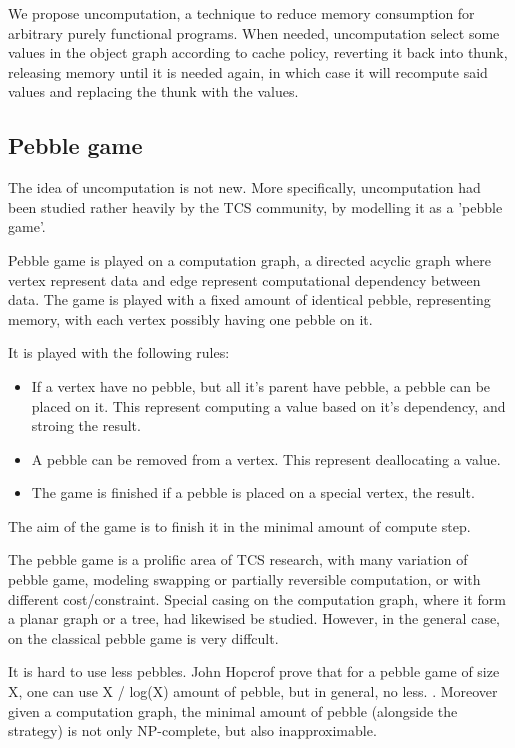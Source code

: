 We propose uncomputation, a technique to reduce memory consumption for arbitrary purely functional programs. When needed, uncomputation select some values in the object graph according to cache policy, reverting it back into thunk, releasing memory until it is needed again, in which case it will recompute said values and replacing the thunk with the values.

\subsection{Pebble game}
The idea of uncomputation is not new. More specifically, uncomputation had been studied rather heavily by the TCS community, by modelling it as a 'pebble game'. 

Pebble game is played on a computation graph, a directed acyclic graph where vertex represent data and edge represent computational dependency between data. The game is played with a fixed amount of identical pebble, representing memory, with each vertex possibly having one pebble on it. 

It is played with the following rules:
\begin{itemize}
\item If a vertex have no pebble, but all it's parent have pebble, a pebble can be placed on it. This represent computing a value based on it's dependency, and stroing the result.
\item A pebble can be removed from a vertex. This represent deallocating a value.
\item The game is finished if a pebble is placed on a special vertex, the result.
\end{itemize}

The aim of the game is to finish it in the minimal amount of compute step.

The pebble game is a prolific area of TCS research, with many variation of pebble game, modeling swapping or partially reversible computation, or with different cost/constraint. Special casing on the computation graph, where it form a planar graph or a tree, had likewised be studied. However, in the general case, on the classical pebble game is very diffcult.

It is hard to use less pebbles. John Hopcrof prove that for a pebble game of size X, one can use X / log(X) amount of pebble, but in general, no less. . Moreover given a computation graph, the minimal amount of pebble (alongside the strategy) is not only NP-complete, but also inapproximable.

